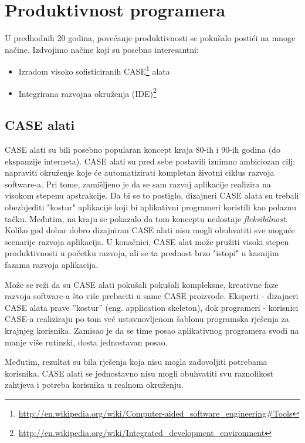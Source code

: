 \documentclass[times, utf8, seminar]{fit}
\begin{document}
\section{Produktivnost programera}

U predhodnih 20 godina, povećanje produktivnosti se pokušalo postići na mnoge načine. Izdvojimo načine koji su posebno interesantni:

\begin{itemize}
  \item Izradom visoko sofisticiranih CASE\footnote{\url{http://en.wikipedia.org/wiki/Computer-aided_software_engineering#Tools}} alata
  \item Integrirana razvojna okruženja (IDE)\footnote{\url{http://en.wikipedia.org/wiki/Integrated_development_environment}} 
\end{itemize}

\subsection{CASE alati}

CASE alati su bili posebno popularan koncept kraja 80-ih i 90-ih godina (do ekspanzije interneta). CASE alati su pred sebe postavili iznimno ambiciozan cilj: napraviti okruženje koje će automatizirati kompletan životni ciklus razvoja software-a. Pri tome, zamišljeno je da se sam razvoj aplikacije realizira na visokom stepenu apstrakcije. Da bi se to postiglo, dizajneri CASE alata su trebali obezbjediti "kostur" aplikacije koji bi aplikativni programeri koristili kao polaznu tačku. Međutim, na kraju se pokazalo da tom konceptu nedostaje \emph{fleksibilnost}. Koliko god dobar dobro dizajniran CASE alati nisu mogli obuhvatiti sve moguće scenarije razvoja aplikacija. U konačnici, CASE alat može pružiti visoki stepen produktivnosti u početku razvoja, ali se ta prednost brzo "istopi" u kasnijim fazama razvoja aplikacija. 

Može se reži da su CASE alati pokušali pokušali kompleksne, kreativne faze razvoja software-a što više prebaciti u same CASE proizvode. Eksperti - dizajneri CASE alata prave ''kostur'' (eng. application skeleton), dok programeri - korisnici CASE-a realiziraju po tom već ustavnovljenom šablonu programska rješenja za krajnjeg korisnika. Zamisao je da se time posao aplikativnog programera svodi na manje više rutinski, dosta jednostavan posao.

Međutim, rezultat su bila rješenja koja nisu mogla zadovoljiti potrebama korisnika. CASE alati se jednostavno nisu mogli obuhvatiti svu raznolikost zahtjeva i potreba korisnika u realnom okruženju.
\end{document}
